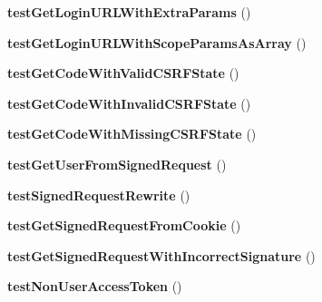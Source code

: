 \begin{DoxyCompactItemize}
\item 
\hypertarget{classPHPSDKTestCase_ada36c8fc911c8caabe298794be7484d4}{{\bfseries test\-Get\-Login\-U\-R\-L\-With\-Extra\-Params} ()}\label{classPHPSDKTestCase_ada36c8fc911c8caabe298794be7484d4}

\item 
\hypertarget{classPHPSDKTestCase_a42a55c152e102c4be974c1853adc81a2}{{\bfseries test\-Get\-Login\-U\-R\-L\-With\-Scope\-Params\-As\-Array} ()}\label{classPHPSDKTestCase_a42a55c152e102c4be974c1853adc81a2}

\item 
\hypertarget{classPHPSDKTestCase_a5cdc60226d93c60f5b0cfcf104292c1e}{{\bfseries test\-Get\-Code\-With\-Valid\-C\-S\-R\-F\-State} ()}\label{classPHPSDKTestCase_a5cdc60226d93c60f5b0cfcf104292c1e}

\item 
\hypertarget{classPHPSDKTestCase_a174fb38891b8753f2b7d7684344d7acc}{{\bfseries test\-Get\-Code\-With\-Invalid\-C\-S\-R\-F\-State} ()}\label{classPHPSDKTestCase_a174fb38891b8753f2b7d7684344d7acc}

\item 
\hypertarget{classPHPSDKTestCase_a49215584c48fdc35ddb292d5e06db1b1}{{\bfseries test\-Get\-Code\-With\-Missing\-C\-S\-R\-F\-State} ()}\label{classPHPSDKTestCase_a49215584c48fdc35ddb292d5e06db1b1}

\item 
\hypertarget{classPHPSDKTestCase_afaf4a010ecdf9076f78700ae95cc92b5}{{\bfseries test\-Get\-User\-From\-Signed\-Request} ()}\label{classPHPSDKTestCase_afaf4a010ecdf9076f78700ae95cc92b5}

\item 
\hypertarget{classPHPSDKTestCase_a48119f847834af4773947824984e7982}{{\bfseries test\-Signed\-Request\-Rewrite} ()}\label{classPHPSDKTestCase_a48119f847834af4773947824984e7982}

\item 
\hypertarget{classPHPSDKTestCase_ae8252e5db02dca4ed006c9d9626a1a67}{{\bfseries test\-Get\-Signed\-Request\-From\-Cookie} ()}\label{classPHPSDKTestCase_ae8252e5db02dca4ed006c9d9626a1a67}

\item 
\hypertarget{classPHPSDKTestCase_a1cac72cdb57f0d734e043300d88aa008}{{\bfseries test\-Get\-Signed\-Request\-With\-Incorrect\-Signature} ()}\label{classPHPSDKTestCase_a1cac72cdb57f0d734e043300d88aa008}

\item 
\hypertarget{classPHPSDKTestCase_a5dbf51699ea924abb7786a9831eb9931}{{\bfseries test\-Non\-User\-Access\-Token} ()}\label{classPHPSDKTestCase_a5dbf51699ea924abb7786a9831eb9931}


\end{DoxyCompactItemize}
